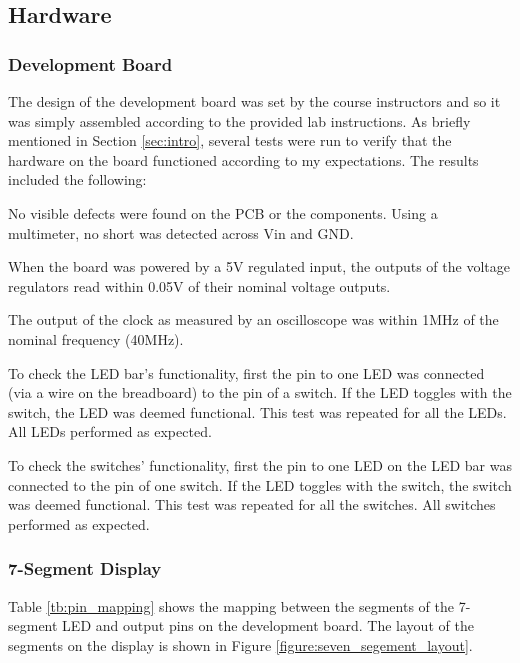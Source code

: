 \documentclass[11pt]{article}
\begin{document}
\subsection{Hardware}

\subsubsection{Development Board}

The design of the development board was set by the course instructors and so it was simply assembled according to the provided lab instructions. As briefly mentioned in Section \ref{sec:intro}, several tests were run to verify that the hardware on the board functioned according to my expectations. The results included the following:

	\begin{description} \itemsep0pt
		\item[Pre-assembly Inspection ] No visible defects were found on the PCB or the components. Using a multimeter, no short was detected across Vin and GND.
		\item[Power Supply ] When the board was powered by a 5V regulated input, the outputs of the voltage regulators read within 0.05V of their nominal voltage outputs. 
		\item[Clock ] The output of the clock as measured by an oscilloscope was within 1MHz of the nominal frequency (40MHz).
		\item[LED Bar ] To check the LED bar's functionality, first the pin to one LED was connected (via a wire on the breadboard) to the pin of a switch. If the LED toggles with the switch, the LED was deemed functional. This test was repeated for all the LEDs. All LEDs performed as expected.
		\item[Switches ] To check the switches' functionality, first the pin to one LED on the LED bar was connected to the pin of one switch. If the LED toggles with the switch, the switch was deemed functional. This test was repeated for all the switches. All switches performed as expected.
		
		
	\end{description}


\subsubsection{7-Segment Display}


 Table \ref{tb:pin_mapping} shows the mapping between the segments of the 7-segment LED and output pins on the development board. The layout of the segments on the display is shown in Figure \ref{figure:seven_segement_layout}.
\end{document}

